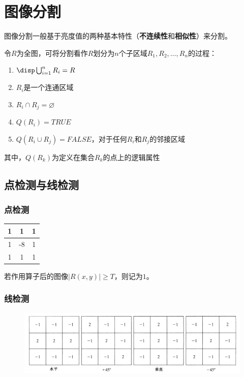 
\section{图像分割} %
图像分割一般基于亮度值的两种基本特性（\textbf{不连续性}和\textbf{相似性}）来分割。

\begin{definition}[分割]
令$R$为全图，可将分割看作$R$划分为$n$个子区域$R_1,R_2,\ldots,R_n$的过程：
\begin{enumerate}
	\item $\disp\bigcup_{i=1}^n R_i=R$
	\item $R_i$是一个连通区域
	\item $R_i\cap R_j=\varnothing$
	\item $Q(R_i)=TRUE$
	\item $Q(R_i\cup R_j)=FALSE$，对于任何$R_i$和$R_j$的邻接区域
\end{enumerate}
其中，$Q(R_k)$为定义在集合$R_k$的点上的逻辑属性
\end{definition}

\subsection{点检测与线检测}
\subsubsection{点检测}
\begin{center}
\begin{tabular}{|c|c|c|}\hline
1 & 1 & 1\\\hline
1 & -8 & 1\\\hline
1 & 1 & 1\\\hline
\end{tabular}
\end{center}
若作用算子后的图像$|R(x,y)|\geq T$，则记为$1$。

\subsubsection{线检测}
\begin{figure}[H]
\centering
\includegraphics[width=0.9\linewidth]{fig/line_detect.png}
\end{figure}

